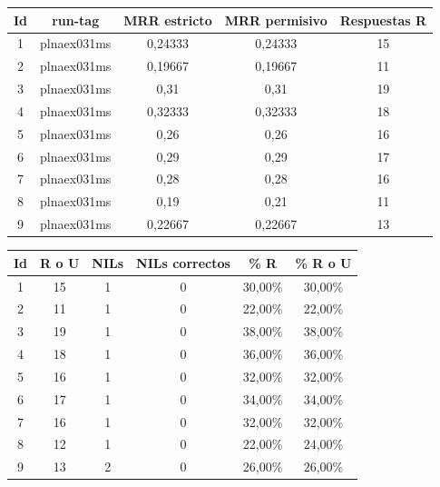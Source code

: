 \documentclass[12pt,a4paper,titlepage]{article}
\begin{document}
\begin{table}[h!]
\begin{center}
\begin{tabular}{|c|c|c|c|c|}
\hline
Id & run-tag & MRR estricto & MRR permisivo & Respuestas R\\ \hline
1 & plnaex031ms & 0,24333 & 0,24333 & 15\\ \hline
2 & plnaex031ms & 0,19667 & 0,19667 & 11\\ \hline
3 & plnaex031ms & 0,31 & 0,31 & 19\\ \hline
4 & plnaex031ms & 0,32333 & 0,32333 & 18\\ \hline
5 & plnaex031ms & 0,26 & 0,26 & 16\\ \hline
6 & plnaex031ms & 0,29 & 0,29 & 17\\ \hline
7 & plnaex031ms & 0,28 & 0,28 & 16\\ \hline
8 & plnaex031ms & 0,19 & 0,21 & 11 \\ \hline
9 & plnaex031ms & 0,22667 & 0,22667 & 13\\ \hline
\end{tabular}
\end{center}
\end{table}

\begin{table}[h!]
\begin{center}
\begin{tabular}{|c|c|c|c|c|c|}
\hline
Id & R o U & NILs & NILs correctos & \% R & \% R o U\\ \hline
1 & 15 & 1 & 0 & 30,00\% & 30,00\% \\ \hline
2 & 11 & 1 & 0 & 22,00\% & 22,00\% \\ \hline
3 & 19 & 1 & 0 & 38,00\% & 38,00\% \\ \hline
4 & 18 & 1 & 0 & 36,00\% & 36,00\% \\ \hline
5 & 16 & 1 & 0 & 32,00\% & 32,00\% \\ \hline
6 & 17 & 1 & 0 & 34,00\% & 34,00\% \\ \hline
7 & 16 & 1 & 0 & 32,00\% & 32,00\% \\ \hline
8 & 12 & 1 & 0 & 22,00\% & 24,00\% \\ \hline
9 & 13 & 2 & 0 & 26,00\% & 26,00\% \\ \hline
\end{tabular}
\end{center}
\end{table}
\end{document}
